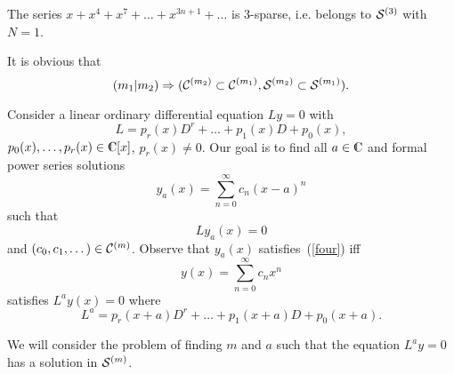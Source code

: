 The series $x+x^4+x^7+\dots+x^{3n+1}+\dots$ is 3-sparse, i.e. belongs
to ${\cal S}^{(3)}$ with $N=1$.

It is obvious that
$$
(m_1 | m_2 )\Rightarrow ( {\cal C}^{(m_2)} \subset {\cal C}^{(m_1)},
{\cal S}^{(m_2)} \subset {\cal S}^{(m_1)} ).
$$

Consider a linear ordinary differential equation $Ly=0$ with
\begin{equation}
\label{two}
L=p_r(x) D^r + \dots + p_1(x) D + p_0(x),
\end{equation}
$p_0(x),\dots,p_r(x) \in \complex[x]$, $p_r(x) \ne 0$. Our goal is to find
all  $a \in \complex$ and formal power series solutions
\begin{equation}
\label{three}
y_a(x)=\sum_{n=0}^\infty c_n(x-a)^n
\end{equation}
such that
\begin{equation}
\label{four}
Ly_a(x) = 0
\end{equation}
and $(c_0,c_1,\dots)\in {\cal C}^{(m)}$. Observe that $y_a(x)$
satisfies~(\ref{four}) iff
$$
y(x)=\sum_{n=0}^\infty c_n x^n
$$
satisfies $L^ay(x)=0$ where
\begin{equation}
\label{five}
L^a=p_r(x+a)D^r+\dots+p_1(x+a)D+p_0(x+a).
\end{equation}

We will consider the problem of finding $m$ and $a$ such that
the equation $L^ay=0$ has a solution in ${\cal S}^{(m)}$.

